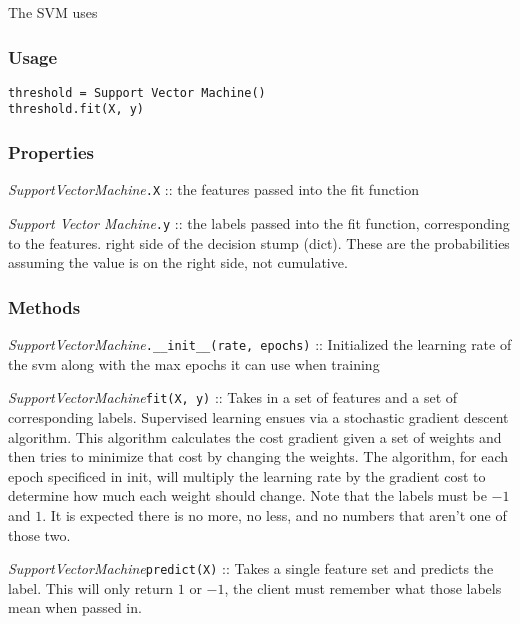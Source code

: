 \documentclass{article}
\begin{document}
The SVM uses 

\subsubsection{Usage}

\begin{verbatim}
threshold = Support Vector Machine()
threshold.fit(X, y)
\end{verbatim}

\subsubsection{Properties}

\textit{SupportVectorMachine}\texttt{.X} :: the features passed into the fit function

\textit{Support Vector Machine}\texttt{.y} :: the labels passed into the fit function,
corresponding to the features.
right side of the decision stump (dict).  These are the probabilities assuming
the value is on the right side, not cumulative.

\subsubsection{Methods}

\textit{SupportVectorMachine}\texttt{.\_\_init\_\_(rate, epochs)} :: Initialized
the learning rate of the svm along with the max epochs it can use when training

\textit{SupportVectorMachine}\texttt{fit(X, y)} :: Takes in a set of features
and a set of corresponding labels. Supervised learning ensues via a stochastic
gradient descent algorithm. This algorithm calculates the cost gradient given a
set of weights and then tries to minimize that cost by changing the weights. The
algorithm, for each epoch specificed in init, will multiply the learning rate by
the gradient cost to determine how much each weight should change. Note that the
labels must be $-1$ and $1$. It is expected there is no more, no less, and no
numbers that aren't one of those two.

\textit{SupportVectorMachine}\texttt{predict(X)} :: Takes a single feature set
and predicts the label. This will only return $1$ or $-1$, the client must
remember what those labels mean when passed in.
\end{document}
